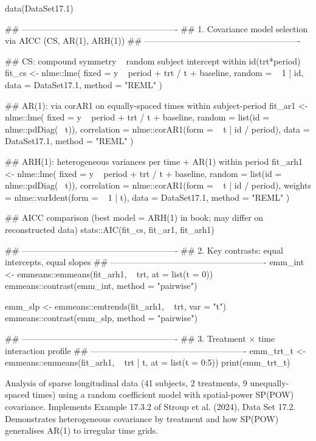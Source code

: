\documentclass[a4paper]{book}
\begin{document}
\begin{Examples}
\begin{ExampleCode}
data(DataSet17.1)

## -------------------------------------------------------
## 1. Covariance model selection via AICC (CS, AR(1), ARH(1))
## -------------------------------------------------------

## CS: compound symmetry ~ random subject intercept within id(trt*period)
fit_cs <- nlme::lme(
  fixed     = y ~ period + trt / t + baseline,
  random    = ~ 1 | id,
  data      = DataSet17.1,
  method    = "REML"
)

## AR(1): via corAR1 on equally-spaced times within subject-period
fit_ar1 <- nlme::lme(
  fixed       = y ~ period + trt / t + baseline,
  random      = list(id = nlme::pdDiag(~ t)),
  correlation = nlme::corAR1(form = ~ t | id / period),
  data        = DataSet17.1,
  method      = "REML"
)

## ARH(1): heterogeneous variances per time + AR(1) within period
fit_arh1 <- nlme::lme(
  fixed       = y ~ period + trt / t + baseline,
  random      = list(id = nlme::pdDiag(~ t)),
  correlation = nlme::corAR1(form = ~ t | id / period),
  weights     = nlme::varIdent(form = ~ 1 | t),
  data        = DataSet17.1,
  method      = "REML"
)

## AICC comparison (best model = ARH(1) in book; may differ on reconstructed data)
stats::AIC(fit_cs, fit_ar1, fit_arh1)

## -------------------------------------------------------
## 2. Key contrasts: equal intercepts, equal slopes
## -------------------------------------------------------
emm_int <- emmeans::emmeans(fit_arh1, ~ trt, at = list(t = 0))
emmeans::contrast(emm_int, method = "pairwise")

emm_slp <- emmeans::emtrends(fit_arh1, ~ trt, var = "t")
emmeans::contrast(emm_slp, method = "pairwise")

## -------------------------------------------------------
## 3. Treatment × time interaction profile
## -------------------------------------------------------
emm_trt_t <- emmeans::emmeans(fit_arh1, ~ trt | t,
                               at = list(t = 0:5))
print(emm_trt_t)
\end{ExampleCode}
\end{Examples}
%
\begin{Description}
Analysis of sparse longitudinal data (41 subjects, 2 treatments, 9 unequally-
spaced times) using a random coefficient model with spatial-power SP(POW)
covariance.  Implements Example 17.3.2 of Stroup et al. (2024), Data Set 17.2.
Demonstrates heterogeneous covariance by treatment and how SP(POW) generalises
AR(1) to irregular time grids.
\end{Description}
\end{document}
